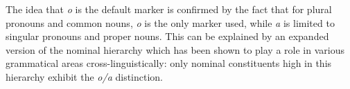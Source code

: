The idea that \textit{o} is the default marker is confirmed by the fact that for plural pronouns and common nouns, \textit{o} is the only marker used, while \textit{{\ꞌ}}\textit{a} is limited to singular pronouns and proper nouns. This can be explained by an expanded version of the nominal hierarchy which has been shown to play a role in various grammatical areas cross-linguistically: only nominal constituents high in this hierarchy exhibit the \textit{o/a} distinction.
